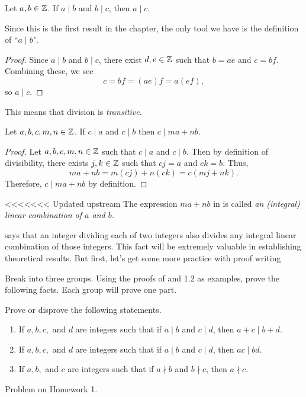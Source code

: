 \documentclass{ximera}
\begin{document}
\begin{proposition}\label{prop:div-trans}
Let $a,b\in\mathbb Z$. If $a\mid b$ and $b \mid c$, then $a\mid c$.
\end{proposition}

Since this is the first result in the chapter, the only tool we have is the definition of ``$a\mid b$". 

\begin{proof}
  Since $a\mid b$ and $b \mid c$, there exist $d,e\in\mathbb Z$ such that $b=ae$ and $c=bf$. Combining these, we see \[c=bf=(ae)f=a(ef),\] so $a\mid c$.
\end{proof}

This means that division is \emph{transitive}. 


\begin{proposition}\label{prop:linear-combo}
  Let $a,b,c,m,n\in\mathbb Z$.
  If $c\mid a$ and $c\mid b$ then $c\mid ma+nb$.

  \begin{proof}
    Let $a,b,c,m,n\in\mathbb Z$ such that $c\mid a$ and $c\mid b$. Then by definition of divisibility, there exists $j,k\in\mathbb Z$ such that $cj=a$ and $ck=b$. Thus, \[ma+nb=m(cj)+n(ck)=c(mj+nk).\] Therefore, $c\mid ma+nb$ by definition.
  \end{proof}
\end{proposition}

\begin{defn}
<<<<<<< Updated upstream
The expression $ma+nb$ in  is called \emph{an (integral) linear combination of $a$ and $b$.}
\end{defn}
 says that an integer dividing each of two integers also divides any integral linear combination of those integers. This fact will be extremely valuable in establishing theoretical results. But first, let's get some more practice with proof writing

Break into three groups. Using the proofs of  and 1.2 as examples, prove the following facts. Each group will prove one part.

\begin{br}\label{divisfacts}
Prove or disprove the following statements.
\begin{enumerate}[label=(\alph*)]
\item If $a,b,c,$ and $d$ are integers such that if $a\mid b$ and $c\mid d$, then $a+c\mid b+d$.
\item If $a,b,c,$ and $d$ are integers such that if $a\mid b$ and $c\mid d$, then $ac\mid bd$.
\item If $a,b,$ and $c$ are integers such that if $a\nmid b$ and $b\nmid c$, then $a\nmid c$.
\end{enumerate}
\end{br}
\begin{solution}
Problem on Homework 1.
\end{solution}
\end{document}
